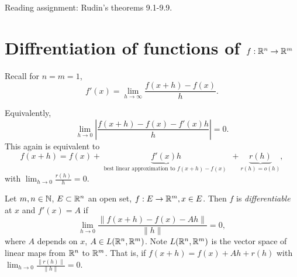 \begin{thm}
\begin{remark}
\begin{enumerate}
		\end{enumerate}
		\item Reading assignment: Rudin's theorems 9.1-9.9.
	\end{remark}
\end{thm}

\section{Diffrentiation of functions of $f: \mathbb{R}^{n} \to \mathbb{R}^{m}$}

Recall for $n=m=1$,
\[
	f'(x)=\lim_{h\to \infty}{\frac{f(x+h)-f(x)}{h}}
	.\]

Equivalently, \[
	\lim_{h\to 0}{\left|\frac{f(x+h)-f(x)-f'(x)h}{h}\right|}=0
	.\]
This again is equivalent to
\[
	f(x+h)=f(x)+\underbrace{f'(x) h}_{\text{ best linear approximation to $f(x+h)-f(x)$ } }+\underbrace{r(h)}_{r(h)=o(h)}
	,\]
with $\lim_{h\to 0}{\frac{r(h)}{h}}=0$.


\begin{define}[11]
	Let $m,n \in \mathbb{N}$, $E \subset \mathbb{R}^{n}$ an open set, $f: E\to \mathbb{R}^{m}, x \in E$.
	Then $f$ is \textit{differentiable} at $x$ and $f'(x)=A$ if
	\[
		\lim_{h\to 0}{\frac{\|f(x+h)-f(x)-Ah\|}{\|h\|}}=0
		,\] where $A$ depends on $x$, $A \in L(\mathbb{R}^{n},\mathbb{R}^{m})$.
	Note $L(\mathbb{R}^{n},\mathbb{R}^{m})$ is the vector space of linear maps from $\mathbb{R}^{n}$ to $\mathbb{R}^{m}$.
	That is, if $f(x+h)=f(x)+Ah+r(h)$ with $\lim_{h\to 0}{\frac{\|r(h)\|}{\|h\|}}=0$.
\end{define}

